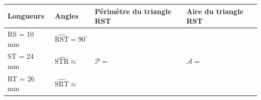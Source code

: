 \vspace{0,5cm}

\begin{tabularx}{\linewidth}{|*{4}{>{}X|}} \hline
	\textbf{Longueurs} & \textbf{Angles} & \textbf{Périmètre du triangle RST} & \textbf{Aire du triangle RST}\\ \hline
	
	\rule[-3mm]{0mm}{10mm}RS = 10 mm & $\widehat{\mathrm{RST}} = 90^{\circ}$ & \multirow{3}{*}{\rule{0mm}{12mm}$ \mathcal{P} = $}
	& \multirow{3}{*}{\rule{0mm}{12mm}$ \mathcal{A} = $}
	\\ \cline{1-2}
	\rule[-3mm]{0mm}{10mm}ST = 24 mm & $\widehat{\mathrm{STR}} \approx$ &&\\ \cline{1-2}
	\rule[-3mm]{0mm}{10mm}RT = 26 mm & $\widehat{\mathrm{SRT}} \approx$ &&\\ \hline
	
\end{tabularx}

